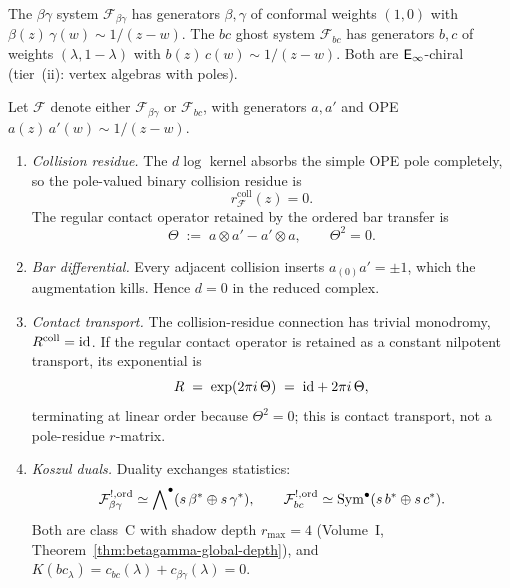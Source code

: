 The $\beta\gamma$ system $\mathcal{F}_{\beta\gamma}$ has generators
$\beta, \gamma$ of conformal weights $(1,0)$ with
$\beta(z)\,\gamma(w) \sim 1/(z{-}w)$. The $bc$ ghost system
$\mathcal{F}_{bc}$ has generators $b,c$ of weights
$(\lambda,1{-}\lambda)$ with
$b(z)\,c(w) \sim 1/(z{-}w)$. Both are $\mathsf{E}_{\infty}$-chiral
(tier~(ii): vertex algebras with poles).

\begin{theorem}
\label{thm:bg-ordered-bar}
\label{thm:bg-rmatrix}
\label{thm:bg-koszul-dual}
\label{thm:bc-ordered-bar}
Let $\mathcal{F}$ denote either $\mathcal{F}_{\beta\gamma}$ or
$\mathcal{F}_{bc}$, with generators $a,a'$ and OPE
$a(z)\,a'(w) \sim 1/(z{-}w)$.
\begin{enumerate}[label=\textup{(\alph*)}]
\item \emph{Collision residue.} The $d\log$ kernel absorbs the
simple OPE pole completely, so the pole-valued binary collision
residue is
\[
r^{\mathrm{coll}}_{\mathcal F}(z)=0.
\]
The regular contact operator retained by the ordered bar transfer is
\begin{equation}\label{eq:bg-theta}
\Theta \;:=\; a \otimes a' - a' \otimes a, \qquad
\Theta^2 = 0.
\end{equation}

\item \emph{Bar differential.} Every adjacent collision
inserts $a_{(0)}a' = \pm 1$, which the augmentation kills.
Hence $d = 0$ in the reduced complex.

\item \emph{Contact transport.} The collision-residue connection has
trivial monodromy, $R^{\mathrm{coll}}=\mathrm{id}$. If the regular contact
operator is retained as a constant nilpotent transport, its
exponential is
\begin{equation}\label{eq:bg-rmatrix}
R \;=\; \exp(2\pi i\,\Theta) \;=\; \mathrm{id} + 2\pi i\,\Theta,
\end{equation}
terminating at linear order because $\Theta^2 = 0$; this is contact
transport, not a pole-residue $r$-matrix.

\item \emph{Koszul duals.} Duality exchanges statistics:
\begin{equation}\label{eq:bg-koszul-dual}
\mathcal{F}_{\beta\gamma}^{!,\mathrm{ord}}
\simeq \bigwedge\nolimits^{\bullet}(s\,\beta^*
 \oplus s\,\gamma^*),
\qquad
\mathcal{F}_{bc}^{!,\mathrm{ord}}
\simeq \mathrm{Sym}^{\bullet}(s\,b^*
 \oplus s\,c^*).
\end{equation}
Both are class~C with shadow depth $r_{\max} = 4$
\textup{(}Volume~I,
Theorem~\textup{\ref*{thm:betagamma-global-depth}}\textup{)},
and $K(bc_\lambda) = c_{bc}(\lambda)+c_{\beta\gamma}(\lambda) = 0$.
\end{enumerate}
\end{theorem}

